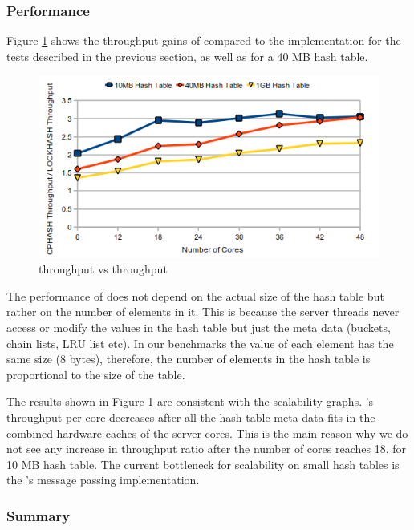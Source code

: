 \subsubsection{Performance}

Figure \ref{fig:cphashspeedup} shows the throughput gains of \cphash{} compared to the \lockhash{} implementation for the tests described in 
the previous section, as well as for a 40 MB hash table.

\begin{figure}[!ht]
  \centering
  \includegraphics[width=\linewidth]{figs/cphashspeedup.png}
  \caption{\cphash{} throughput vs \lockhash{} throughput}
  \label{fig:cphashspeedup}
\end{figure}

The performance of \cphash{} does not depend on the actual size of the hash table but rather on the number of elements in it. This is because the server 
threads never access or modify the values in the hash table but just the meta data (buckets, chain lists, LRU list etc). In our benchmarks the value of 
each element has the same size (8 bytes), therefore, the number of elements in the hash table is proportional to the size of the table.

The results shown in Figure \ref{fig:cphashspeedup} are consistent with the scalability graphs. \cphash{}'s throughput per core decreases after all 
the hash table meta data fits in the combined hardware caches of the server cores. This is the main reason why we do not see any increase in throughput ratio after 
the number of cores reaches 18, for 10 MB hash table. The current bottleneck for scalability on small hash tables is the \cphash{}'s message passing implementation.

\subsubsection{Summary}

